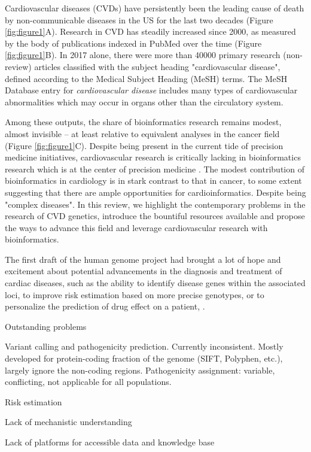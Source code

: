 \documentclass[letter]{bioinfo}
\begin{document}
Cardiovascular diseases (CVDs) have persistently been the leading cause of death by non-communicable diseases in the US for the last two decades (Figure \ref{fig:figure1}A). Research in CVD has steadily increased since 2000, as measured by the body of publications indexed in PubMed over the time (Figure \ref{fig:figure1}B). In 2017 alone, there were more than 40000 primary research (non-review) articles classified with the subject heading "cardiovascular disease", defined according to the Medical Subject Heading (MeSH) terms. The MeSH Database entry for \textit{cardiovascular disease} includes many types of cardiovascular abnormalities which may occur in organs other than the circulatory system.

Among these outputs, the share of bioinformatics research remains modest, almost invisible -- at least relative to equivalent analyses in the cancer field (Figure \ref{fig:figure1}C). Despite being present in the current tide of precision medicine initiatives, cardiovascular research is critically lacking in bioinformatics research which is at the center of precision medicine \citep{Gomez-Lopez:2017:Precision}.  The modest contribution of bioinformatics in cardiology is in stark contrast to that in cancer, to some extent suggesting that there are ample opportunities for cardioinformatics. Despite being "complex diseases". In this review, we highlight the contemporary problems in the research of CVD genetics, introduce the bountiful resources available and propose the ways to advance this field and leverage cardiovascular research with bioinformatics.

The first draft of the human genome project had brought a lot of hope and excitement about potential advancements in the diagnosis and treatment of cardiac diseases, such as the ability to identify disease genes within the associated loci, to improve risk estimation based on more precise genotypes, or to personalize the prediction of drug effect on a patient, \citep{Komajda:2001:heart}.


Outstanding problems

Variant calling and pathogenicity prediction. Currently inconsistent. Mostly developed for protein-coding fraction of the genome (SIFT, Polyphen, etc.), largely ignore the non-coding regions.
Pathogenicity assignment: variable, conflicting, not applicable for all populations.

Risk estimation

Lack of mechanistic understanding

Lack of platforms for accessible data and knowledge base
\end{document}
